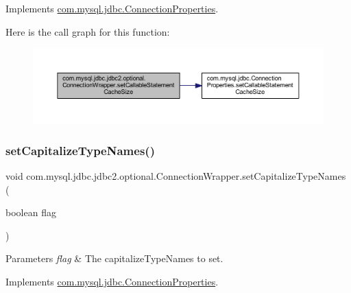 Implements \mbox{\hyperlink{interfacecom_1_1mysql_1_1jdbc_1_1_connection_properties_ab22fc3c53b2a21bf9064036222219e22}{com.\+mysql.\+jdbc.\+Connection\+Properties}}.

Here is the call graph for this function\+:
\nopagebreak
\begin{figure}[H]
\begin{center}
\leavevmode
\includegraphics[width=350pt]{classcom_1_1mysql_1_1jdbc_1_1jdbc2_1_1optional_1_1_connection_wrapper_a8e6ffb0bce5a7d16da96043683ec3f18_cgraph}
\end{center}
\end{figure}
\mbox{\label{classcom_1_1mysql_1_1jdbc_1_1jdbc2_1_1optional_1_1_connection_wrapper_a3f6d10819d7a5abdd49135f847c99fa4}} 
\subsubsection{\texorpdfstring{set\+Capitalize\+Type\+Names()}{setCapitalizeTypeNames()}}
{\footnotesize\ttfamily void com.\+mysql.\+jdbc.\+jdbc2.\+optional.\+Connection\+Wrapper.\+set\+Capitalize\+Type\+Names (\begin{DoxyParamCaption}\item[{boolean}]{flag }\end{DoxyParamCaption})}


\begin{DoxyParams}{Parameters}
{\em flag} & The capitalize\+Type\+Names to set. \\
\hline
\end{DoxyParams}


Implements \mbox{\hyperlink{interfacecom_1_1mysql_1_1jdbc_1_1_connection_properties_a4a5d21e7dfd9bedd2eb10f3169629288}{com.\+mysql.\+jdbc.\+Connection\+Properties}}.


